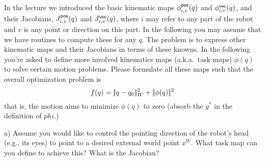 

\renewcommand{\course}{Robotics}
\renewcommand{\coursepicture}{roboticsLecture}
\renewcommand{\coursedate}{Winter 2014}
\renewcommand{\exnum}{3}

\exercises




In the lecture we introduced the basic kinematic maps
$\phi^{\textsf{pos}}_{i,v}(q)$ and $\phi^{\textsf{vec}}_{i,v}(q)$, and their Jacobians,
$J^{\textsf{pos}}_{i,v}(q)$ and $J^{\textsf{vec}}_{i,v}(q)$, where $i$ may refer to any
part of the robot and $v$ is any point or direction on this part. In
the following you may assume that we have routines to compute these
for any $q$. The problem is to express other kinematic maps and their
Jacobians in terms of these knowns. In the following you're asked to
define more involved kinematics maps (a.k.a.\ task maps) $\phi(q)$ to solve
certain motion problems. Please formulate all these maps such that the
overall optimization problem is
$$ f(q) = |\!|q-q_0|\!|^2_W + |\!|\phi(q)|\!|^2 $$
that is, the motion aims to minimize $\phi(q)$ to zero (absorb the
$y^*$ in the definition of $phi$.)

a) Assume you would like to control the pointing direction of the robot's
head (e.g., its eyes) to point to a desired external world point $x^W$. What
task map can you define to achieve this? What is the Jacobian?

